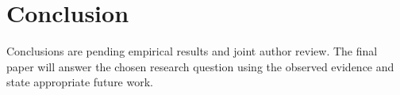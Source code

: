 \section{Conclusion}
Conclusions are pending empirical results and joint author review.
The final paper will answer the chosen research question using the observed
evidence and state appropriate future work.
